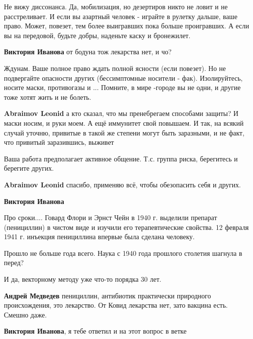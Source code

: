 \begin{itemize}
\begin{itemize}
Не вижу диссонанса. Да, мобилизация, но дезертиров никто не ловит и не
расстреливает. И если вы азартный человек - играйте в рулетку дальше, ваше
право. Может, повезет, тем более выигравших пока больше проигравших. А если вы
на передовой, будьте добры, наденьте каску и бронежилет.

\textbf{Виктория Иванова} от бодуна тож лекарства нет, и чо?

\end{itemize} %


Ждунам. Ваше полное право ждать полной ясности (если повезет). Но не
подвергайте опасности других (бессимптомные носители - фак). Изолируйтесь,
носите маски, противогазы и ... Помните, в мире -городе вы не одни, и другие
тоже хотят жить и не болеть.

\begin{itemize} %
\textbf{Abraimov Leonid} а кто сказал, что мы пренебрегаем способами защиты? И маски носим, и руки моем. А ещё иммунитет свой повышаем. И так, на всякий случай уточню, привитые в такой же степени могут быть заразными, и не факт, что привитый заразившись, выживет

Ваша работа предполагает активное общение. Т.с. группа риска, берегитесь и берегите других.

\textbf{Abraimov Leonid} спасибо, применяю всё, чтобы обезопасить себя и других.
\end{itemize} %

\textbf{Виктория Иванова}

Про сроки.... Говард Флори и Эрнст Чейн в 1940 г. выделили препарат
(пенициллин) в чистом виде и изучили его терапевтические свойства. 12 февраля
1941 г. инъекция пенициллина впервые была сделана человеку.

Прошло не больше года всего. Наука с 1940 года прошлого столетия шагнула в
перед?

И да, векторному методу уже что-то порядка 30 лет.

\begin{itemize} %
\textbf{Андрей Медведев} пенициллин, антибиотик практически природного происхождения, это лекарство. От Ковид лекарства нет, зато вакцина есть. Смешно даже.

\textbf{Виктория Иванова}, я тебе ответил и на этот вопрос в ветке


\end{itemize}
\end{itemize}
